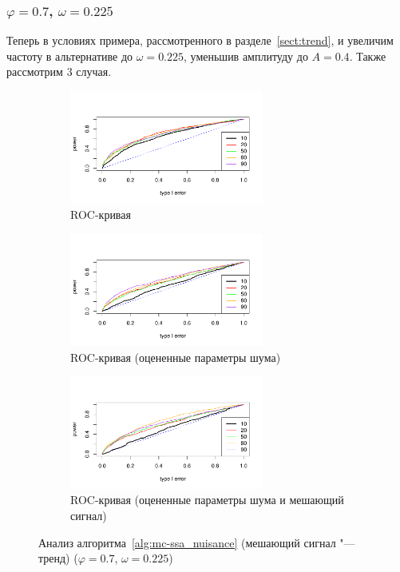 \documentclass[specialist,
substylefile = spbu_report.rtx,
subf,href,colorlinks=true, 12pt]{disser}
\theoremstyle{definition}
\begin{document}
\subsubsection{$\varphi=0.7$, $\omega=0.225$}
Теперь в условиях примера, рассмотренного в разделе~\ref{sect:trend}, и увеличим частоту в альтернативе до $\omega=0.225$, уменьшив амплитуду до $A=0.4$. Также рассмотрим $3$ случая.
\begin{figure}[h!]
	\captionsetup[subfigure]{justification=Centering}
	\begin{subfigure}[t]{\textwidth}
		\centering
		\includegraphics[width=0.7\textwidth]{img/roc_trend_phi7_omega0225.pdf}
		\caption{ROC-кривая}
		\label{fig:roc_trend_phi7_omega0225}
	\end{subfigure}
	\begin{subfigure}[t]{\textwidth}
		\centering
		\includegraphics[width=0.7\textwidth]{img/roc_trend_phi7est_omega0225.pdf}
		\caption{ROC-кривая (оцененные параметры шума)}
		\label{fig:roc_trend_phi7est_omega0225}
	\end{subfigure}
	\begin{subfigure}[t]{\textwidth}
		\centering
		\includegraphics[width=0.7\textwidth]{img/roc_trend_phi7est_signal_omega0225.pdf}
		\caption{ROC-кривая (оцененные параметры шума и мешающий сигнал)}
		\label{fig:roc_trend_phi7est_signal_omega0225}
	\end{subfigure}
	\caption{Анализ алгоритма~\ref{alg:mc-ssa_nuisance} (мешающий сигнал "--- тренд) ($\varphi=0.7$, $\omega=0.225$)}
	\label{fig:trend_phi7_omega0225}
\end{figure}
\end{document}
